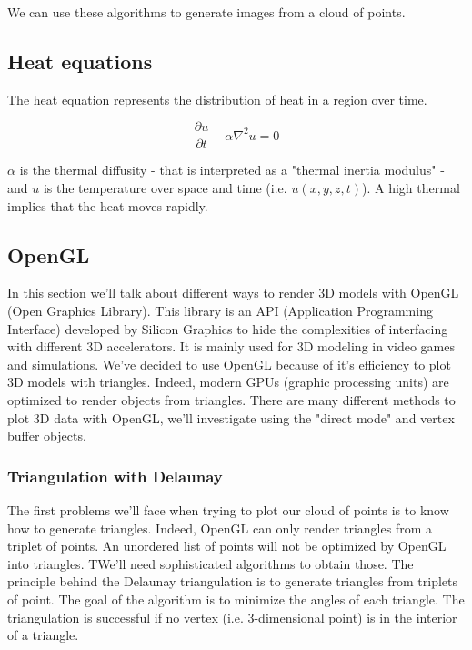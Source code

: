 We can use these algorithms to generate images from a cloud of points.


\subsection{Heat equations}

The heat equation represents the distribution of heat in a region over time.

\begin{equation}\label{eqn:heateq}
\frac{\partial u}{\partial t} - \alpha \nabla^2 u = 0
\end{equation}


$\alpha$ is the thermal diffusity - that is interpreted as a "thermal inertia modulus" - and $u$ is the temperature over space and time (i.e. $u(x,y,z,t)$). A high thermal implies that the heat moves rapidly.

\subsection{OpenGL}

In this section we'll talk about different ways to render 3D models with OpenGL (Open Graphics Library). This library is an API (Application Programming Interface) developed by Silicon Graphics to hide the complexities of interfacing with different 3D accelerators. It is mainly used for 3D modeling in video games and simulations. We've decided to use OpenGL because of it's efficiency to plot 3D models with triangles. Indeed, modern GPUs (graphic processing units) are optimized to render objects from triangles. There are many different methods to plot 3D data with OpenGL, we'll investigate using the "direct mode" and vertex buffer objects.

\subsubsection{Triangulation with Delaunay}

The first problems we'll face when trying to plot our cloud of points is to know how to generate triangles. Indeed, OpenGL can only render triangles from a triplet of points. An unordered list of points will not be optimized by OpenGL into triangles. TWe'll need sophisticated algorithms to obtain those.
The principle behind the Delaunay triangulation is to generate triangles from triplets of point. The goal of the algorithm is to minimize the angles of each triangle. The triangulation is successful if no vertex (i.e. 3-dimensional point) is in the interior of a triangle.

